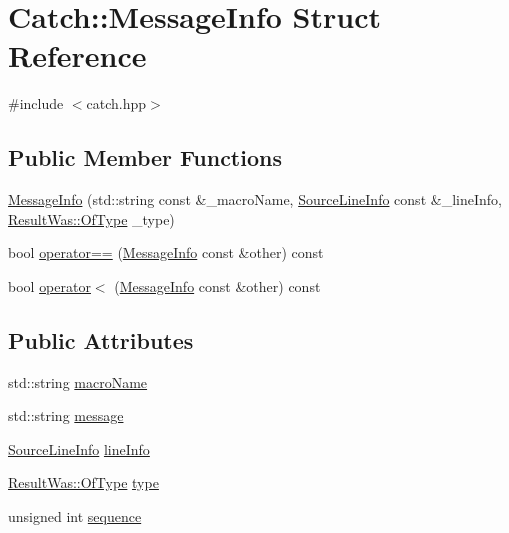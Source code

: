 \hypertarget{struct_catch_1_1_message_info}{}\section{Catch\+:\+:Message\+Info Struct Reference}
\label{struct_catch_1_1_message_info}


{\ttfamily \#include $<$catch.\+hpp$>$}

\subsection*{Public Member Functions}
\begin{DoxyCompactItemize}
\item 
\mbox{\hyperlink{struct_catch_1_1_message_info_a2e336c33ebef7af3c1bbae6a56e14f8a}{Message\+Info}} (std\+::string const \&\+\_\+macro\+Name, \mbox{\hyperlink{struct_catch_1_1_source_line_info}{Source\+Line\+Info}} const \&\+\_\+line\+Info, \mbox{\hyperlink{struct_catch_1_1_result_was_a624e1ee3661fcf6094ceef1f654601ef}{Result\+Was\+::\+Of\+Type}} \+\_\+type)
\item 
bool \mbox{\hyperlink{struct_catch_1_1_message_info_af4b37f2172ba55395813b4bb6bbbde1a}{operator==}} (\mbox{\hyperlink{struct_catch_1_1_message_info}{Message\+Info}} const \&other) const
\item 
bool \mbox{\hyperlink{struct_catch_1_1_message_info_a8254cb8fca2da02a29a9843cdcb79df1}{operator$<$}} (\mbox{\hyperlink{struct_catch_1_1_message_info}{Message\+Info}} const \&other) const
\end{DoxyCompactItemize}
\subsection*{Public Attributes}
\begin{DoxyCompactItemize}
\item 
std\+::string \mbox{\hyperlink{struct_catch_1_1_message_info_a156ade4b3cc731f6ec7b542ae47ba8e3}{macro\+Name}}
\item 
std\+::string \mbox{\hyperlink{struct_catch_1_1_message_info_ab6cd06e050bf426c6577502a5c50e256}{message}}
\item 
\mbox{\hyperlink{struct_catch_1_1_source_line_info}{Source\+Line\+Info}} \mbox{\hyperlink{struct_catch_1_1_message_info_a985165328723e599696ebd8e43195cc5}{line\+Info}}
\item 
\mbox{\hyperlink{struct_catch_1_1_result_was_a624e1ee3661fcf6094ceef1f654601ef}{Result\+Was\+::\+Of\+Type}} \mbox{\hyperlink{struct_catch_1_1_message_info_ae928b9117465c696e45951d9d0284e78}{type}}
\item 
unsigned int \mbox{\hyperlink{struct_catch_1_1_message_info_a7f4f57ea21e50160adefce7b68a781d6}{sequence}}
\end{DoxyCompactItemize}


